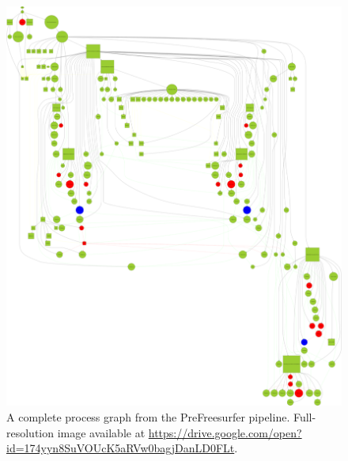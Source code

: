 \documentclass[a4paper,num-refs]{oup-contemporary}
\begin{document}
\begin{figure}
  \includegraphics[width=1\textwidth]{images/graph}
  \caption{A complete process graph from the PreFreesurfer pipeline.
Full-resolution image available at \url{https://drive.google.com/open?id=174yyn8SuVOUcK5aRVw0bagjDanLD0FLt}.}
  \label{fig:complete-graph}
\end{figure}



\end{document}

